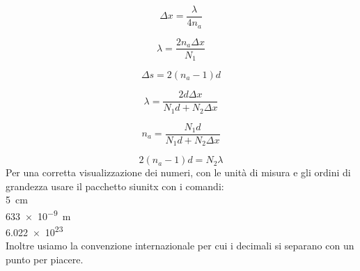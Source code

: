 \documentclass[a4paper,11pt]{article}
\begin{document}
	\label{interf} %
	\label{strum} %
	\label{calib} %
	
	\begin{equation}\label{delta}
	\Delta x = \dfrac{\lambda}{4n_a}
	\end{equation}
	
	\begin{equation}\label{lambdana}
	\lambda=\dfrac{2n_a\Delta x}{N_1}		
	\end{equation}
	
	\begin{equation}\label{deltavuoto}
	\Delta s = 2(n_a-1)d
	\end{equation}
	
	\begin{equation}\label{lambda}
	\lambda=\dfrac{2d\Delta x}{N_1 d + N_2 \Delta x}
	\end{equation}
	
	\begin{equation}\label{na}
	n_a=\dfrac{N_1 d}{N_1 d + N_2 \Delta x}
	\end{equation}
	
	\begin{equation}\label{indice_aria}
	2 (n_a - 1) d = N_2 \lambda
	\end{equation}
	Per una corretta visualizzazione dei numeri, con le unità di misura e gli ordini di grandezza usare il pacchetto siunitx con i comandi:\\
	
		\SI{5}{\centi\meter}
	\\
		\SI{633e-9}{\meter}
	\\
		\num{6.022e23}
	\\
	Inoltre usiamo la convenzione internazionale per cui i decimali si separano con un punto per piacere.
	

	
\end{document}
